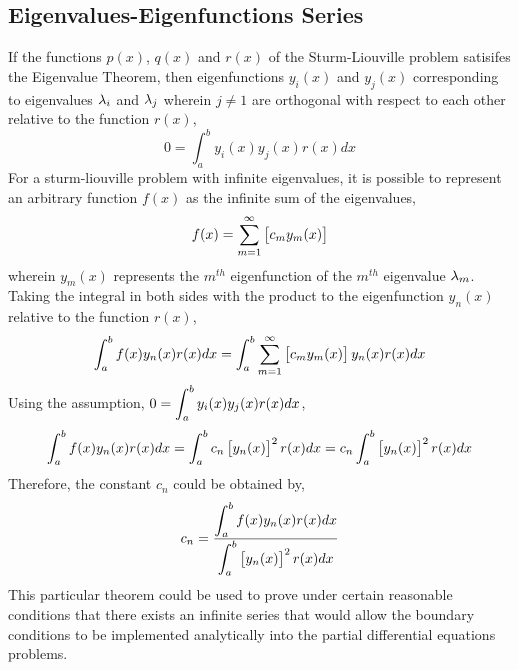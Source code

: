 \documentclass[a4paper, 12pt]{report}
\begin{document}
\begin{center}
\section{Eigenvalues-Eigenfunctions Series}
\begin{comment}
\end{comment}
If the functions $p(x)$, $q(x)$ and $r(x)$ of the Sturm-Liouville problem satisifes the Eigenvalue Theorem, then eigenfunctions $y_i(x)$ and $y_j(x)$ corresponding to eigenvalues $\lambda_i$ and $\lambda_j$ wherein $j\neq1$ are orthogonal with respect to each other relative to the function $r(x)$,
$$0 = \int^{b}_{a}y_i(x)y_j(x)r(x)dx$$
For a sturm-liouville problem with infinite eigenvalues, it is possible to represent an arbitrary function $f(x)$ as the infinite sum of the eigenvalues,
$$f(x) = \sum^{\infty}_{m=1}\left[c_my_m(x)\right]$$
wherein $y_m(x)$ represents the $m^{th}$ eigenfunction of the $m^{th}$ eigenvalue $\lambda_m$. Taking the integral in both sides with the product to the eigenfunction $y_n(x)$ relative to the function $r(x)$,
$$\int^{b}_{a}f(x)y_n(x)r(x)dx = \int^{b}_{a}\sum^{\infty}_{m=1}\left[c_my_m(x)\right]y_n(x)r(x)dx$$
Using the assumption, $\displaystyle{0 = \int^{b}_{a}y_i(x)y_j(x)r(x)dx}$,
$$\int^{b}_{a}f(x)y_n(x)r(x)dx = \int^{b}_{a}c_n\left[y_n(x)\right]^2r(x)dx = c_n\int^{b}_{a}\left[y_n(x)\right]^2r(x)dx$$
Therefore, the constant $c_n$ could be obtained by,
$$c_n = \frac{\displaystyle{\int^{b}_{a}f(x)y_n(x)r(x)dx}}{\displaystyle{\int^{b}_{a}\left[y_n(x)\right]^2r(x)dx}}$$
This particular theorem could be used to prove under certain reasonable conditions that there exists an infinite series that would allow the boundary conditions to be implemented analytically into the partial differential equations problems.
\end{center}
\end{document}
